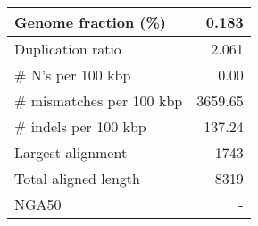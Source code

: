 \documentclass[12pt,a4paper]{article}
\begin{document}
\begin{table}[ht]
\begin{center}
\begin{tabular}{|l*{1}{|r}|}
Genome fraction (\%) & 0.183 \\ \hline
Duplication ratio & 2.061 \\ \hline
\# N's per 100 kbp & 0.00 \\ \hline
\# mismatches per 100 kbp & 3659.65 \\ \hline
\# indels per 100 kbp & 137.24 \\ \hline
Largest alignment & 1743 \\ \hline
Total aligned length & 8319 \\ \hline
NGA50 & - \\ \hline
\end{tabular}
\end{center}
\end{table}
\end{document}
